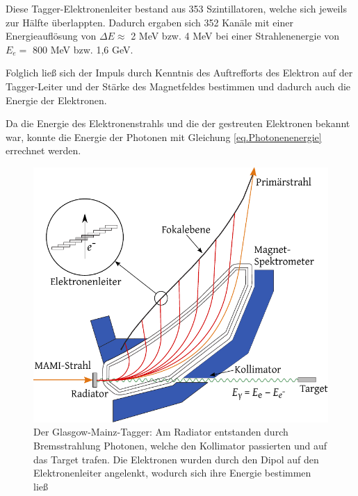 \documentclass[a4paper,11pt,oneside,final,german,openbib,pdftex]{scrbook}
\begin{document}
{ Diese Tagger-Elektronenleiter bestand aus 353 Szintillatoren, welche sich jeweils zur H\"alfte \"uberlappten.
 Dadurch ergaben sich 352 Kan\"ale mit einer Energieaufl\"osung von $\Delta E \approx$  2 MeV bzw. 4 MeV bei einer Strahlenenergie von $E_e=$ 800 MeV bzw. 1,6 GeV. 
 
 Folglich lie{\ss} sich der Impuls durch Kenntnis des Auftrefforts des Elektron auf der Tagger-Leiter und der St\"arke des Magnetfeldes bestimmen und dadurch auch die Energie der Elektronen.
 
 Da die Energie des Elektronenstrahls und die der gestreuten Elektronen bekannt war, konnte die Energie der Photonen mit Gleichung \ref{eq.Photonenenergie} errechnet werden.
\newline 
\begin{figure}[h!]
	\begin{center}
	\includegraphics{TAGGER}
	
	\caption{Der Glasgow-Mainz-Tagger: Am Radiator entstanden durch Bremsstrahlung Photonen, welche den Kollimator passierten und auf das Target trafen. Die Elektronen wurden durch den Dipol auf den Elektronenleiter angelenkt, wodurch sich ihre Energie bestimmen lie{\ss}\cite{Un08}}
\label{fig.TAGGER}	
\end{center}
\end{figure}
 
}
\end{document}
